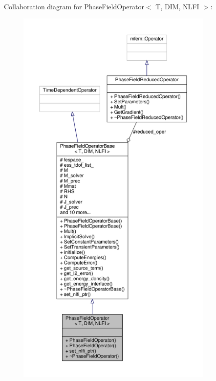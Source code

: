 Collaboration diagram for Phase\+Field\+Operator$<$ T, D\+IM, N\+L\+FI $>$\+:\nopagebreak
\begin{figure}[H]
\begin{center}
\leavevmode
\includegraphics[height=550pt]{classPhaseFieldOperator__coll__graph}
\end{center}
\end{figure}
